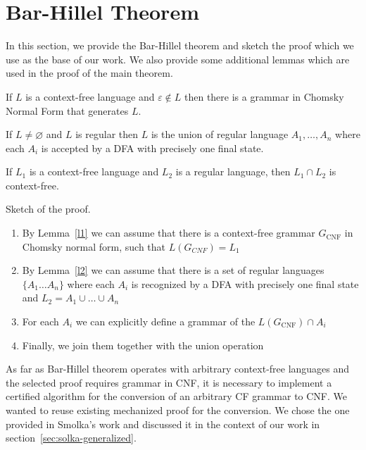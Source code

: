 \section{Bar-Hillel Theorem}
\label{sec:b-h-th}

In this section, we provide the Bar-Hillel theorem and sketch the proof which we use as the base of our work.
We also provide some additional lemmas which are used in the proof of the main theorem.

\begin{lemma} \label{l1}
	If $L$ is a context-free language and $\varepsilon \notin L$ then there is a grammar in Chomsky Normal Form that generates $L$.
\end{lemma}

\begin{lemma} \label{l2}
	If $ L \neq \varnothing $ and $L$ is regular then $L$ is the union of regular language $A_1, \ldots , A_n$ where each $A_i$ is accepted by a DFA with precisely one final state.
\end{lemma}

\begin{theorem}
	If $L_1$ is a context-free language and $L_2$ is a regular language, then $L_1 \cap L_2$ is context-free.
\end{theorem}


Sketch of the proof.
\begin{enumerate}
	\item By Lemma~\ref{l1} we can assume that there is a context-free grammar $G_{\text{CNF}}$ in Chomsky normal form, such that $L(G_{CNF}) = L_1$
	\item By Lemma~\ref{l2} we can assume that there is a set of regular languages $\{A_{1} \ldots A_n \}$ where each $A_i$ is recognized by a DFA with precisely one final state and $L_2 = A_1 \cup \ldots \cup A_n$
	\item For each $A_i$ we can explicitly define a grammar of the $L( G_{\text{CNF}} ) \cap A_i$
	\item Finally, we join them together with the union operation
\end{enumerate}

As far as Bar-Hillel theorem operates with arbitrary context-free languages and the selected proof requires grammar in CNF, it is necessary to implement a certified algorithm for the conversion of an arbitrary CF grammar to CNF.
We wanted to reuse existing mechanized proof for the conversion.
We chose the one provided in Smolka's work and discussed it in the context of our work in section~\ref{sec:solka-generalized}.
